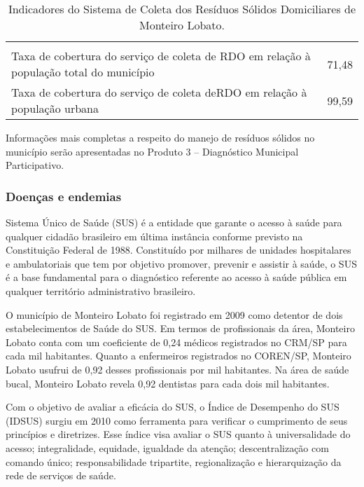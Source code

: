 \begin{table}[htbp]
	\centering
	\caption{Indicadores do Sistema de Coleta dos Resíduos Sólidos Domiciliares de Monteiro Lobato.}
	\begin{tabular}{P{6cm}|c}
		  \\
		 Taxa de cobertura do serviço de coleta de RDO em relação à população total do município & 71,48 \\
		 Taxa de cobertura do serviço de coleta deRDO em relação à população urbana & 99,59 \\
	\end{tabular}%
	\label{tab:indicadores_rs}%
\end{table}%


Informações mais completas a respeito do manejo de resíduos sólidos no município serão apresentadas no Produto 3 – Diagnóstico Municipal Participativo. 

\subsubsection{Doenças e endemias}

Sistema Único de Saúde (SUS) é a entidade que garante o acesso à saúde para qualquer cidadão brasileiro em última instância conforme previsto na Constituição Federal de 1988. Constituído por milhares de unidades hospitalares e ambulatoriais que tem por objetivo promover, prevenir e assistir à saúde, o SUS é a base fundamental para o diagnóstico referente ao acesso à saúde pública em qualquer território administrativo brasileiro. 

O município de Monteiro Lobato foi registrado em 2009 como detentor de dois estabelecimentos de Saúde do SUS. Em termos de profissionais da área, Monteiro Lobato conta com um coeficiente de 0,24 médicos registrados no CRM/SP para cada mil habitantes. Quanto a enfermeiros registrados no COREN/SP, Monteiro Lobato usufrui de 0,92 desses profissionais por mil habitantes. Na área de saúde bucal, Monteiro Lobato revela 0,92 dentistas para cada dois mil habitantes.

Com o objetivo de avaliar a eficácia do SUS, o Índice de Desempenho do SUS (IDSUS) surgiu em 2010 como ferramenta para verificar o cumprimento de seus princípios e diretrizes. Esse índice visa avaliar o SUS quanto à universalidade do acesso; integralidade, equidade, igualdade da atenção; descentralização com comando único; responsabilidade tripartite, regionalização e hierarquização da rede de serviços de saúde.

